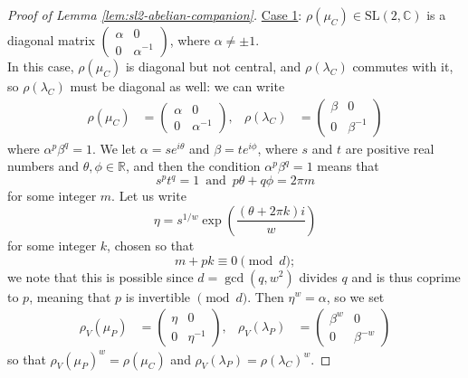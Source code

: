 \documentclass[11pt]{amsart}
\numberwithin{equation}{section}
\numberwithin{theorem}{section}
\theoremstyle{definition}
\newcommand{\R}{\mathbb{R}}
\newcommand{\C}{\mathbb{C}}
\newcommand\SL{\mathrm{SL}}
\begin{document}
\begin{proof}[Proof of Lemma \ref{lem:sl2-abelian-companion}]
\vspace{1em}\noindent
\underline{Case 1}: $\rho(\mu_C) \in \SL(2,\C)$ is a diagonal matrix $\left(\begin{smallmatrix} \alpha & 0 \\ 0 & \alpha^{-1} \end{smallmatrix}\right)$, where $\alpha \neq \pm1$.\\

In this case, $\rho(\mu_C)$ is diagonal but not central, and $\rho(\lambda_C)$ commutes with it, so $\rho(\lambda_C)$ must be diagonal as well: we can write
\begin{align*}
\rho(\mu_C) &= \begin{pmatrix} \alpha & 0 \\ 0 & \alpha^{-1} \end{pmatrix}, &
\rho(\lambda_C) &= \begin{pmatrix} \beta & 0 \\ 0 & \beta^{-1} \end{pmatrix}
\end{align*}
where $\alpha^p \beta^q = 1$.  We let $\alpha = s e^{i\theta}$ and $\beta = t e^{i\phi}$, where $s$ and $t$ are positive real numbers and $\theta,\phi\in\R$, and then the condition $\alpha^p\beta^q=1$ means that
\[
s^pt^q = 1 \,\textrm{ and }\,
p\theta + q\phi = 2\pi m
\]
for some integer $m$.  Let us write
\[ \eta = s^{1/w} \exp\left( \frac{(\theta+2\pi k)i}{w} \right) \]
for some integer $k$, chosen so that 
\[ m+pk \equiv 0 \pmod{d}; \]
we note that this is possible since $d=\gcd(q,w^2)$ divides $q$ and is thus coprime to $p$, meaning that $p$ is invertible $\!\!\!\pmod{d}$.   Then $\eta^w = \alpha$, so we set
\begin{align*}
\rho_V(\mu_P) &= \begin{pmatrix} \eta & 0 \\ 0 & \eta^{-1} \end{pmatrix}, &
\rho_V(\lambda_P) &= \begin{pmatrix} \beta^w & 0 \\ 0 & \beta^{-w} \end{pmatrix}
\end{align*}
so that $\rho_V(\mu_P)^w = \rho(\mu_C)$ and $\rho_V(\lambda_P) = \rho(\lambda_C)^w$.


\end{proof}
\end{document}
